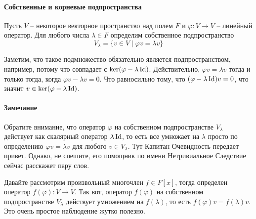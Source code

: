 \paragraph{Собственные и корневые подпространства}

\begin{definition}
Пусть $V$ -- некоторое векторное пространство над полем $F$ и $\varphi \colon V\to V$ -- линейный оператор.
Для любого числа $\lambda \in F$ определим собственное подпространство
\[
V_\lambda = \{v\in V\mid \varphi v = \lambda v\}
\]
\end{definition}

Заметим, что такое подмножество обязательно является подпространством, например, потому что совпадает с $\ker (\varphi - \lambda \operatorname{Id})$.
Действительно, $\varphi v = \lambda v$ тогда и только тогда, когда $\varphi v - \lambda v = 0$.
Что равносильно тому, что $(\varphi - \lambda \operatorname{Id})v = 0$, что значит $v\in \ker(\varphi - \lambda \operatorname{Id})$.

\paragraph{Замечание}

Обратите внимание, что оператор $\varphi$ на собственном подпространстве $V_\lambda$ действует как скалярный оператор $\lambda \operatorname{Id}$, то есть все умножает на $\lambda$ просто по определению $\varphi v = \lambda v$ для любого $v\in V_\lambda$.
Тут Капитан Очевидность передает привет.
Однако, не спешите, его помощник по имени Нетривиальное Следствие сейчас расскажет пару слов.

Давайте рассмотрим произвольный многочлен $f\in F[x]$, тогда определен оператор $f(\varphi)\colon V\to V$.
Так вот, оператор $f(\varphi)$ на собственном подпространстве $V_\lambda$ действует умножением на $f(\lambda)$, то есть $f(\varphi) v = f(\lambda) v$.
Это очень простое наблюдение жутко полезно.



